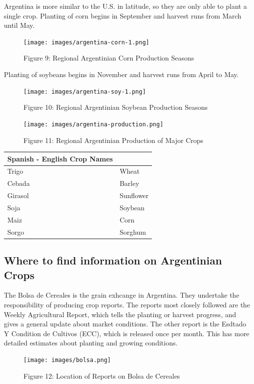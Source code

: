 \documentclass[
]{book}
\begin{document}
Argentina is more similar to the U.S. in latitude, so they are only able to plant a single crop. Planting of corn begins in September and harvest runs from March until May.

\begin{figure}
\centering
\texttt{[image: images/argentina-corn-1.png]}
\caption{Figure 9: Regional Argentinian Corn Production Seasons}
\end{figure}

Planting of soybeans begins in November and harvest runs from April to May.

\begin{figure}
\centering
\texttt{[image: images/argentina-soy-1.png]}
\caption{Figure 10: Regional Argentinian Soybean Production Seasons}
\end{figure}

\begin{figure}
\centering
\texttt{[image: images/argentina-production.png]}
\caption{Figure 11: Regional Argentinian Production of Major Crops}
\end{figure}

\begin{longtable}[]{@{}ll@{}}
\toprule
Spanish - English Crop Names &\tabularnewline
\midrule
\endhead
Trigo & Wheat\tabularnewline
Cebada & Barley\tabularnewline
Girasol & Sunflower\tabularnewline
Soja & Soybean\tabularnewline
Maiz & Corn\tabularnewline
Sorgo & Sorghum\tabularnewline
\bottomrule
\end{longtable}

\hypertarget{where-to-find-information-on-argentinian-crops}{%
\subsection{Where to find information on Argentinian Crops}\label{where-to-find-information-on-argentinian-crops}}

The Bolsa de Cereales is the grain exhcange in Argentina. They undertake the responsibility of producing crop reports. The reports most closely followed are the Weekly Agricultural Report, which tells the planting or harvest progress, and gives a general update about market conditions. The other report is the Esdtado Y Condition de Cultivos (ECC), which is released once per month. This has more detailed estimates about planting and growing conditions.

\begin{figure}
\centering
\texttt{[image: images/bolsa.png]}
\caption{Figure 12: Location of Reports on Bolsa de Cereales}
\end{figure}
\end{document}
